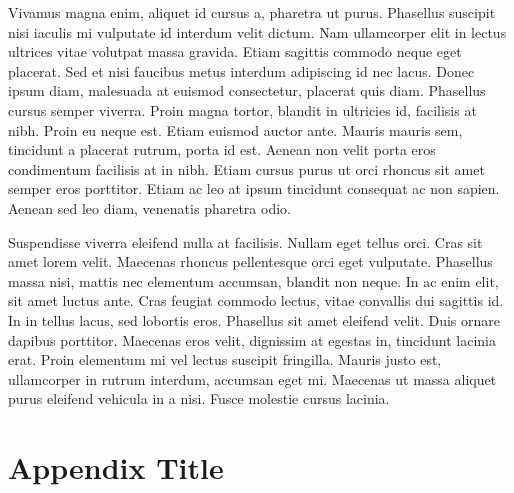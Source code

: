 \documentclass[draft,wrr]{AGUTeX}
\begin{document}
\begin{article}
Vivamus magna enim, aliquet id cursus a, pharetra ut purus. Phasellus suscipit nisi iaculis mi vulputate id interdum velit dictum. Nam ullamcorper elit in lectus ultrices vitae volutpat massa gravida. Etiam sagittis commodo neque eget placerat. Sed et nisi faucibus metus interdum adipiscing id nec lacus. Donec ipsum diam, malesuada at euismod consectetur, placerat quis diam. Phasellus cursus semper viverra. Proin magna tortor, blandit in ultricies id, facilisis at nibh. Proin eu neque est. Etiam euismod auctor ante. Mauris mauris sem, tincidunt a placerat rutrum, porta id est. Aenean non velit porta eros condimentum facilisis at in nibh. Etiam cursus purus ut orci rhoncus sit amet semper eros porttitor. Etiam ac leo at ipsum tincidunt consequat ac non sapien. Aenean sed leo diam, venenatis pharetra odio.

Suspendisse viverra eleifend nulla at facilisis. Nullam eget tellus orci. Cras sit amet lorem velit. Maecenas rhoncus pellentesque orci eget vulputate. Phasellus massa nisi, mattis nec elementum accumsan, blandit non neque. In ac enim elit, sit amet luctus ante. Cras feugiat commodo lectus, vitae convallis dui sagittis id. In in tellus lacus, sed lobortis eros. Phasellus sit amet eleifend velit. Duis ornare dapibus porttitor. Maecenas eros velit, dignissim at egestas in, tincidunt lacinia erat. Proin elementum mi vel lectus suscipit fringilla. Mauris justo est, ullamcorper in rutrum interdum, accumsan eget mi. Maecenas ut massa aliquet purus eleifend vehicula in a nisi. Fusce molestie cursus lacinia.





\appendix

\section{Appendix Title}


\end{article}
\end{document}
